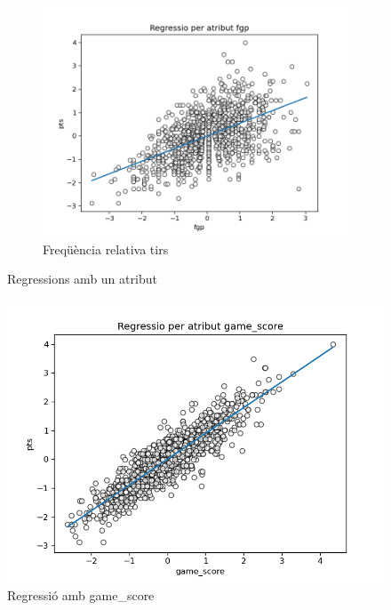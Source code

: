 \documentclass{article}
\begin{document}
\begin{figure}[!h]
\begin{subfigure}[b]{0.25\textwidth}
		\includegraphics[width=\textwidth]{reg9}
		\caption*{Freqüència relativa tirs}
		\label{fig:hist24}
	\end{subfigure}
	\caption{Regressions amb un atribut}
	\label{fig:hist20}
\end{figure}
\begin{figure}[h!]
	\centering
	\includegraphics[width=0.5\linewidth]{reg24}
	\caption{Regressió amb game\_score}
	\label{fig:correlation}
\end{figure}\\
\end{document}

